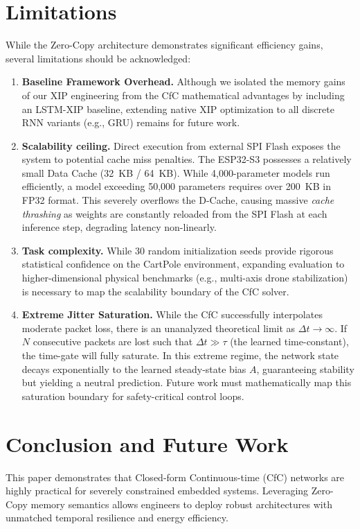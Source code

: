 \documentclass[conference]{IEEEtran}
\begin{document}
\section{Limitations}
While the Zero-Copy architecture demonstrates significant efficiency gains, several limitations should be acknowledged:
\begin{enumerate}
    \item \textbf{Baseline Framework Overhead.} Although we isolated the memory gains of our XIP engineering from the CfC mathematical advantages by including an LSTM-XIP baseline, extending native XIP optimization to all discrete RNN variants (e.g., GRU) remains for future work.
    \item \textbf{Scalability ceiling.} Direct execution from external SPI Flash exposes the system to potential cache miss penalties. The ESP32-S3 possesses a relatively small Data Cache (32~KB / 64~KB). While 4,000-parameter models run efficiently, a model exceeding 50,000 parameters requires over 200~KB in FP32 format. This severely overflows the D-Cache, causing massive \textit{cache thrashing} as weights are constantly reloaded from the SPI Flash at each inference step, degrading latency non-linearly.
    \item \textbf{Task complexity.} While 30 random initialization seeds provide rigorous statistical confidence on the CartPole environment, expanding evaluation to higher-dimensional physical benchmarks (e.g., multi-axis drone stabilization) is necessary to map the scalability boundary of the CfC solver.
    \item \textbf{Extreme Jitter Saturation.} While the CfC successfully interpolates moderate packet loss, there is an unanalyzed theoretical limit as $\Delta t \to \infty$. If $N$ consecutive packets are lost such that $\Delta t \gg \tau$ (the learned time-constant), the time-gate will fully saturate. In this extreme regime, the network state decays exponentially to the learned steady-state bias $A$, guaranteeing stability but yielding a neutral prediction. Future work must mathematically map this saturation boundary for safety-critical control loops.
\end{enumerate}

\section{Conclusion and Future Work}
This paper demonstrates that Closed-form Continuous-time (CfC) networks are highly practical for severely constrained embedded systems. Leveraging Zero-Copy memory semantics allows engineers to deploy robust architectures with unmatched temporal resilience and energy efficiency. 
\end{document}
